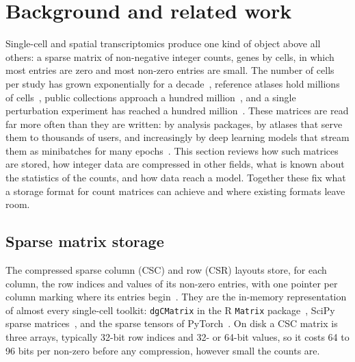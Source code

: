 \section{Background and related work}
\label{sec:background}

Single-cell and spatial transcriptomics produce one kind of object above all others: a sparse matrix of non-negative
integer counts, genes by cells, in which most entries are zero and most non-zero entries are small. The number of
cells per study has grown exponentially for a decade~\cite{svensson2018exponential}, reference atlases hold millions of
cells~\cite{tabulasapiens2022,sikkema2023integrated}, public collections approach a hundred
million~\cite{czi2025cellxgene}, and a single perturbation experiment has reached a hundred
million~\cite{zhang2025tahoe}. These matrices are read far more often than they are written: by analysis
packages, by atlases that serve them to thousands of users, and increasingly by deep learning models that stream
them as minibatches for many epochs~\cite{lopez2018deep,theodoris2023transfer,cui2024scgpt}. This section reviews how
such matrices are stored, how integer data are compressed in other fields, what is known about the statistics of the
counts, and how data reach a model. Together these fix what a storage format for count matrices can achieve and
where existing formats leave room.

\subsection{Sparse matrix storage}

The compressed sparse column (CSC) and row (CSR) layouts store, for each column, the row indices and values of its
non-zero entries, with one pointer per column marking where its entries begin~\cite{saad2003iterative,davis2006direct}.
They are the in-memory representation of almost every single-cell toolkit: \texttt{dgCMatrix} in the R
\texttt{Matrix} package~\cite{bates2024matrix}, SciPy sparse matrices~\cite{virtanen2020scipy}, and the sparse tensors
of PyTorch~\cite{paszke2019pytorch,ansel2024pytorch2}. On disk a CSC matrix is three arrays, typically 32-bit row indices and 32- or
64-bit values, so it costs 64 to 96 bits per non-zero before any compression, however small the counts are.

